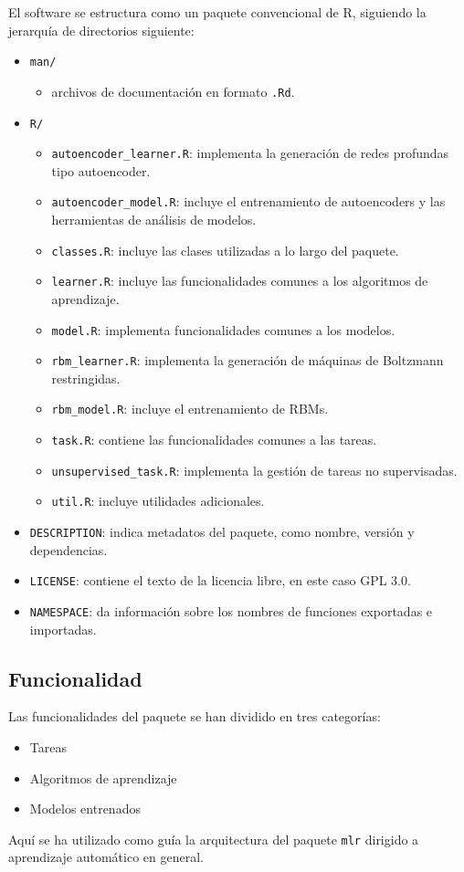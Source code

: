 El software se estructura como un paquete convencional de R, siguiendo la jerarquía de directorios siguiente:
\begin{itemize}
\item \texttt{man/}
  \begin{itemize}
  \item archivos de documentación en formato \texttt{.Rd}.
  \end{itemize}
\item \texttt{R/}
  \begin{itemize}
  \item \texttt{autoencoder\_learner.R}: implementa la generación de redes profundas tipo autoencoder.
  \item \texttt{autoencoder\_model.R}: incluye el entrenamiento de autoencoders y las herramientas de análisis de modelos.
  \item \texttt{classes.R}: incluye las clases utilizadas a lo largo del paquete.
  \item \texttt{learner.R}: incluye las funcionalidades comunes a los algoritmos de aprendizaje.
  \item \texttt{model.R}: implementa funcionalidades comunes a los modelos.
  \item \texttt{rbm\_learner.R}: implementa la generación de máquinas de Boltzmann restringidas.
  \item \texttt{rbm\_model.R}: incluye el entrenamiento de RBMs.
  \item \texttt{task.R}:  contiene las funcionalidades comunes a las tareas.
  \item \texttt{unsupervised\_task.R}: implementa la gestión de tareas no supervisadas. 
  \item \texttt{util.R}: incluye utilidades adicionales.
  \end{itemize}
\item \texttt{DESCRIPTION}: indica metadatos del paquete, como nombre, versión y dependencias.
\item \texttt{LICENSE}: contiene el texto de la licencia libre, en este caso GPL 3.0.
\item \texttt{NAMESPACE}: da información sobre los nombres de funciones exportadas e importadas.
\end{itemize}

\subsection{Funcionalidad}

Las funcionalidades del paquete se han dividido en tres categorías:
\begin{itemize}
\item Tareas
\item Algoritmos de aprendizaje
\item Modelos entrenados
\end{itemize}
Aquí se ha utilizado como guía la arquitectura del paquete \texttt{mlr} \autocite{mlr} dirigido a aprendizaje automático en general.

